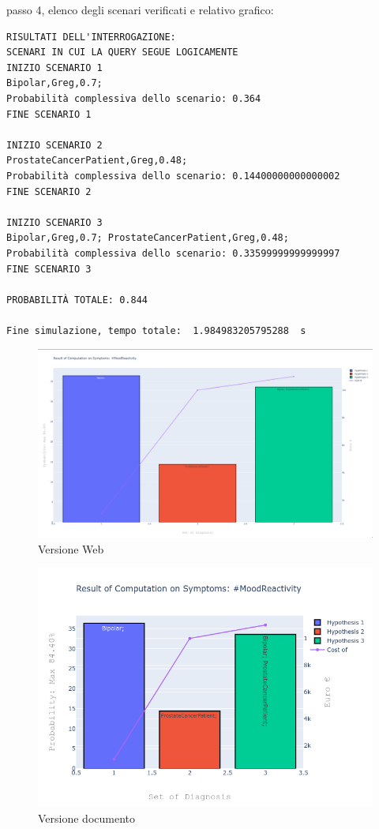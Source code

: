 passo 4, elenco degli scenari verificati e relativo grafico:
\begin{verbatim}
RISULTATI DELL'INTERROGAZIONE: 
SCENARI IN CUI LA QUERY SEGUE LOGICAMENTE
INIZIO SCENARIO 1
Bipolar,Greg,0.7; 
Probabilità complessiva dello scenario: 0.364
FINE SCENARIO 1

INIZIO SCENARIO 2
ProstateCancerPatient,Greg,0.48; 
Probabilità complessiva dello scenario: 0.14400000000000002
FINE SCENARIO 2

INIZIO SCENARIO 3
Bipolar,Greg,0.7; ProstateCancerPatient,Greg,0.48; 
Probabilità complessiva dello scenario: 0.33599999999999997
FINE SCENARIO 3

PROBABILITÀ TOTALE: 0.844

Fine simulazione, tempo totale:  1.984983205795288  s
\end{verbatim}

\begin{figure}
	\centering
	\includegraphics[width=\linewidth]{plot/Caso_di_studio.png}
	\caption{Versione Web}
\end{figure}

\begin{figure}
	\centering
	\includegraphics[width=\linewidth]{plot/caso_di_studio_alt.png}
	\caption{Versione documento}
\end{figure}